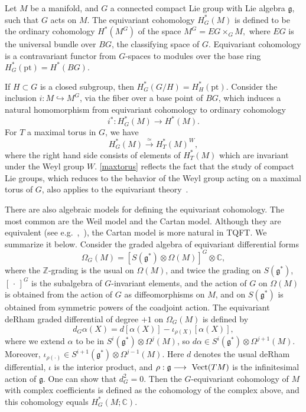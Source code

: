 \documentclass[a4paper,12pt,reqno,sumlimits]{amsart}
\theoremstyle{plain}
\theoremstyle{definition}
\newcommand{\C}{{\mathbb C}}
\newcommand{\Z}{{\mathbb Z}}
\newcommand{\1}{{\bf 1}}
\newcommand{\g}{{\mathfrak  g}}
\renewcommand{\to}{\longrightarrow}
\newcommand{\iso}{\stackrel{\simeq}{\longrightarrow}}
\newcommand{\inc}{\hookrightarrow}
\numberwithin{equation}{section}
\begin{document}
Let $M$ be a manifold, and $G$ a connected compact Lie group with Lie algebra
$\g$, such that $G$ acts on $M$. The equivariant cohomology $H^*_G(M)$ is
defined to be the ordinary cohomology $H^*(M^G)$ of the space $M^G=EG\times_G
M,$ where $EG$ is the universal bundle over $BG$, the classifying space of
$G$.  Equivariant cohomology is a contravariant functor from $G$-spaces to
modules over the base ring $H^*_G(\text{pt})=H^*(BG).$

If $H\subset G$ is a closed subgroup, then $H^*_G(G/H)=H^*_H(\text{pt})$.
Consider the inclusion $i:M\inc M^G$, via the fiber over a base point of
$BG$, which induces a natural homomorphism from equivariant cohomology to
ordinary cohomology
$$
i^*:H^*_G(M)\to H^*(M).
$$
For $T$ a maximal torus in $G$, we have
\begin{equation}
  \label{maxtorus}
  H^*_G(M)\iso H^*_T(M)^W,
\end{equation}
where the right hand side consists of elements of $H^*_T(M)$ which are
invariant under the Weyl group $W$.  \eqref{maxtorus} reflects the
fact that the study of compact Lie groups, which reduces to the behavior of
the Weyl group acting on a maximal torus of $G$, also applies to the
equivariant theory~\cite[p. 4]{ab}.

There are also algebraic models for defining the equivariant cohomology. The
most common are the Weil model and the Cartan model. Although they are
equivalent (see e.g.~\cite{bgv},~\cite{cordes}), the Cartan model is more
natural in TQFT. We summarize it below.  Consider the graded algebra of
equivariant differential forms
$$
\Omega_G(M)=\left[S(\g^*)\otimes\Omega(M)\right]^G\otimes\C ,
$$
where the $\Z$-grading is the usual on $\Omega(M)$, and twice the grading
on $S(\g^*)$, $[\,\cdot\,]^G$ is the subalgebra of $G$-invariant elements,
and the action of $G$ on $\Omega(M)$ is obtained from the action of $G$ as
diffeomorphisms on $M$, and on $S(\g^*)$ is obtained from symmetric powers of
the coadjoint action.  The equivariant  deRham graded differential of degree
$+1$ on $\Omega_G(M)$ is defined by
$$
d_G\alpha(X)=d[\alpha(X)] - \iota_{\rho(X)}[\alpha(X)] ,
$$
where we extend $\alpha$ to be in $S^i(\g^*)\otimes\Omega^j(M)$, so
$d\alpha\in S^i(\g^*)\otimes\Omega^{j+1}(M)$. Moreover,
$\iota_{\rho(\cdot)}\in S^{i+1}(\g^*)\otimes\Omega^{j-1}(M)$.  Here $d$
denotes the usual deRham differential, $\iota$ is the interior product, and
$\rho:\g\to\hbox{ Vect}(TM)$ is the infinitesimal action of $\g$.  One can
show that $d_G^2=0$. Then the $G$-equivariant cohomology of $M$ with complex
coefficients is defined as the cohomology of the complex above, and this
cohomology equals $H^*_G(M;\C)$.
\end{document}
